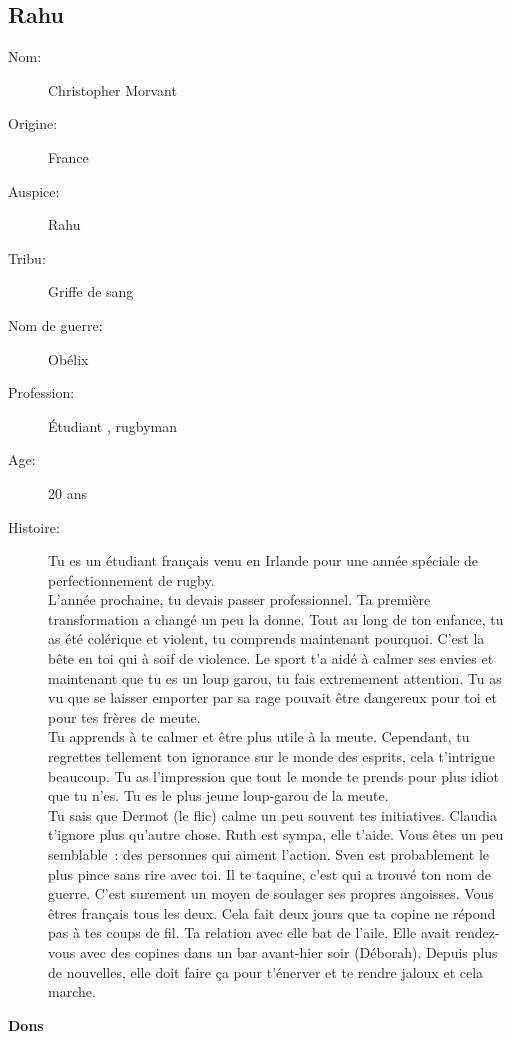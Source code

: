 \documentclass[oneside,12pt]{book}
\begin{document}
\begin{flushleft}
\section{Rahu}
\begin{description}
\item[Nom:]{Christopher Morvant}
\item[Origine:]{France}
\item[Auspice:]{Rahu}
\item[Tribu:]{Griffe de sang}
\item[Nom de guerre:]{Obélix}
\item[Profession:]{Étudiant , rugbyman}
\item[Age:]{20 ans}
\item[Histoire:]{ 
Tu es un étudiant français venu en Irlande pour une année spéciale de perfectionnement de rugby.\\
L'année prochaine, tu devais passer professionnel. Ta première transformation a changé un peu la donne. Tout au long de ton enfance, tu as été colérique et violent, tu comprends maintenant pourquoi. C'est la bête en toi qui à soif de violence. Le sport t'a aidé à calmer ses envies et maintenant que tu es un loup garou, tu fais extremement attention. Tu as vu que se laisser emporter par sa rage pouvait être dangereux pour toi et pour tes frères de meute.\\
Tu apprends à te calmer et être plus utile à la meute. Cependant, tu regrettes tellement ton ignorance sur le monde des esprits, cela t'intrigue beaucoup. Tu as l'impression que tout le monde te prends pour plus idiot que tu n'es. Tu es le plus jeune loup-garou de la meute.\\
Tu sais que Dermot (le flic) calme un peu souvent tes initiatives. 
Claudia t'ignore plus qu'autre chose. Ruth est sympa, elle t'aide. 
Vous êtes un peu semblable : des personnes qui aiment l'action. 
Sven est probablement le plus pince sans rire avec toi. 
Il te taquine, c'est qui a trouvé ton nom de guerre. 
C'est surement un moyen de soulager ses propres angoisses. Vous êtres français tous les deux. 
Cela fait deux jours que ta copine ne répond pas à tes coups de fil. Ta relation avec elle bat de l'aile. Elle avait rendez-vous avec des copines dans un bar avant-hier soir (Déborah). Depuis plus de nouvelles, elle doit faire ça pour t'énerver et te rendre jaloux et cela marche. 
}
\end{description}
\clearpage
\textbf{\large Dons} 
\vspace{0.5cm}


\end{flushleft}
\end{document}
